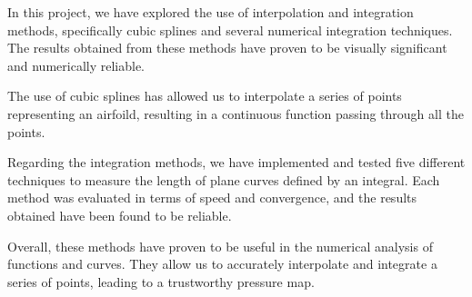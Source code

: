 In this project, we have explored the use of interpolation and integration methods, specifically cubic splines and several numerical integration techniques. The results obtained from these methods have proven to be visually significant and numerically reliable.

The use of cubic splines has allowed us to interpolate a series of points representing an airfoild, resulting in a continuous function passing through all the points.

Regarding the integration methods, we have implemented and tested five different techniques to measure the length of plane curves defined by an integral. Each method was evaluated in terms of speed and convergence, and the results obtained have been found to be reliable.

Overall, these methods have proven to be useful in the numerical analysis of functions and curves. They allow us to accurately interpolate and integrate a series of points, leading to a trustworthy pressure map.
